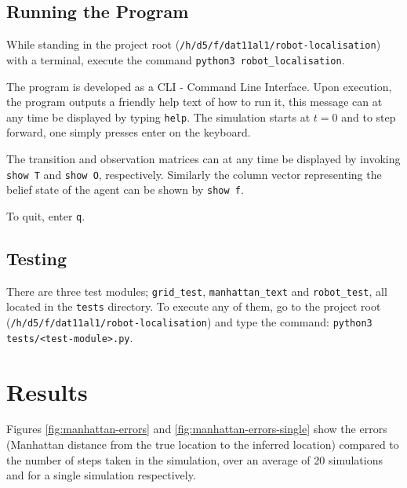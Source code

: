 \documentclass{article}
\begin{document}
\subsection{Running the Program}
While standing in the project root (\texttt{/h/d5/f/dat11al1/robot-localisation}) with a terminal, execute the command \texttt{python3 robot\_localisation}.

The program is developed as a CLI - Command Line Interface. Upon execution, the program outputs a friendly help text of how to run it, this message can at any time be displayed by typing \texttt{help}. The simulation starts at $t = 0$ and to step forward, one simply presses enter on the keyboard.

The transition and observation matrices can at any time be displayed by invoking \texttt{show T} and \texttt{show O}, respectively. Similarly the column vector representing the belief state of the agent can be shown by \texttt{show f}.

To quit, enter \texttt{q}.

\subsection{Testing}

There are three test modules; \texttt{grid\_test}, \texttt{manhattan\_text} and \texttt{robot\_test}, all located in the \texttt{tests} directory. To execute any of them, go to the project root (\texttt{/h/d5/f/dat11al1/robot-localisation}) and type the command: \texttt{python3 tests/<test-module>.py}.
 
 
\section{Results}

Figures \ref{fig:manhattan-errors} and \ref{fig:manhattan-errors-single} show the errors (Manhattan distance from the true location to the inferred location) compared to the number of steps taken in the simulation, over an average of 20 simulations and for a single simulation respectively.
\end{document}
